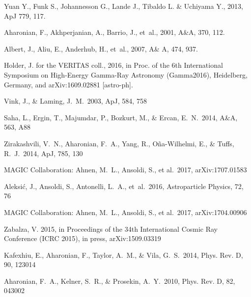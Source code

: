 \documentclass{PoS}
\newcommand\apj{ApJ}
\newcommand\aap{A\&A}
\newcommand\prd{Phys. Rev. D}
\begin{document}
\begin{thebibliography}{99}
 Yuan Y., Funk S., Johannesson G., Lande J., Tibaldo L. \& Uchiyama Y., 2013, ApJ 779, 117.

Aharonian, F., Akhperjanian, A., Barrio, J., {et~al.}, 2001, A\&A, 370, 112.

Albert, J., Aliu, E., Anderhub, H., {et~al.}, 2007, A\& A, 474, 937.

Holder, J. for the VERITAS coll., 2016, in Proc. of the 6th International Symposium on High-Energy Gamma-Ray 
Astronomy (Gamma2016), Heidelberg, Germany, and arXiv:1609.02881 [astro-ph].

 Vink, J., \& Laming, J.~M.\ 2003, \apj, 584, 758 

 Saha, L., Ergin, T., Majumdar, P., Bozkurt, M., \& Ercan, E.~N.\ 2014, \aap, 563, A88 

 Zirakashvili, V.~N., Aharonian, F.~A., Yang, R., O{\~n}a-Wilhelmi, E., \& Tuffs, R.~J.\ 2014, \apj, 785, 130 

 MAGIC Collaboration: Ahnen, M.~L., Ansoldi, S., et al.\ 2017, arXiv:1707.01583







 Aleksi\'c, J., Ansoldi, S., Antonelli, L.~A., et~al.\ 2016, Astroparticle Physics, 72, 76

 MAGIC Collaboration: Ahnen, M.~L., Ansoldi, S., et al.\ 2017, arXiv:1704.00906

 Zabalza, V. 2015, in Proceedings of the 34th International Cosmic Ray
Conference (ICRC 2015), in press, arXiv:1509.03319

 Kafexhiu, E., Aharonian, F., Taylor, A.~M., \& Vila, G.~S.\ 2014, \prd, 90, 123014 

 Aharonian, F.~A., Kelner, S.~R., \& Prosekin, A.~Y.\ 2010, \prd, 82, 043002


\end{thebibliography}
\end{document}

